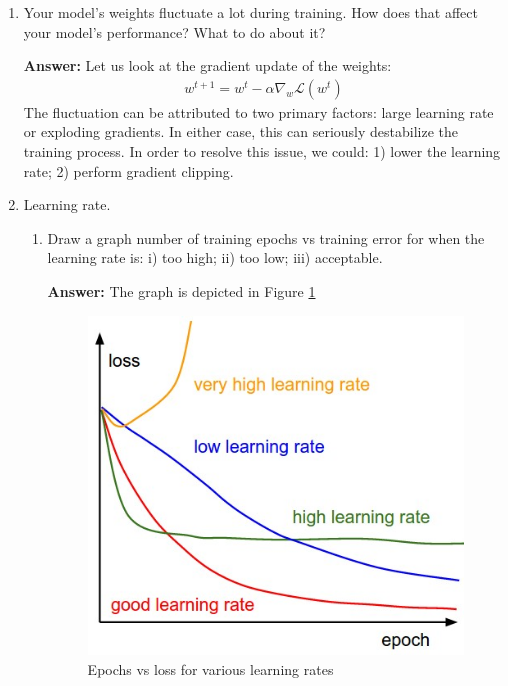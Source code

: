 \documentclass{article}
\newenvironment{QandA}{\begin{enumerate}[label=\arabic*.]}{\end{enumerate}}
\newenvironment{InnerQandA}{\begin{enumerate}[label=\roman*.]}{\end{enumerate}}
\newenvironment{answer}{\par\normalfont \textbf{Answer:}}{}
\begin{document}
\begin{QandA}
\begin{answer}
        (Source: \href{https://stats.stackexchange.com/questions/242004/why-do-neural-network-researchers-care-about-epochs}{StackExchange})
    \end{answer}

    \item Your model’s weights fluctuate a lot during training. How does that affect your model’s performance? What to do about it?
    \begin{answer}
        Let us look at the gradient update of the weights:
        \begin{align*}
            w^{t+1} = w^t - \alpha \nabla_w \mathcal{L}(w^t)
        \end{align*}
        The fluctuation can be attributed to two primary factors: large learning rate or exploding gradients. In either case, this can seriously destabilize the training process. In order to resolve this issue, we could: 1) lower the learning rate; 2) perform gradient clipping. 
    \end{answer}

    \item Learning rate.
    \begin{InnerQandA}
        \item Draw a graph number of training epochs vs training error for when the learning rate is: i) too high; ii) too low; iii) acceptable.
        \begin{answer}
            The graph is depicted in Figure \ref{learning-rate-epochs}
        \end{answer}
        \begin{figure}[h!]
            \centering
            \includegraphics[width=0.5\linewidth]{img/learning-rate-epochs.jpeg}
            \caption{Epochs vs loss for various learning rates\footnotemark }
            \label{learning-rate-epochs}
        \end{figure}


\end{InnerQandA}
\end{QandA}
\end{document}
